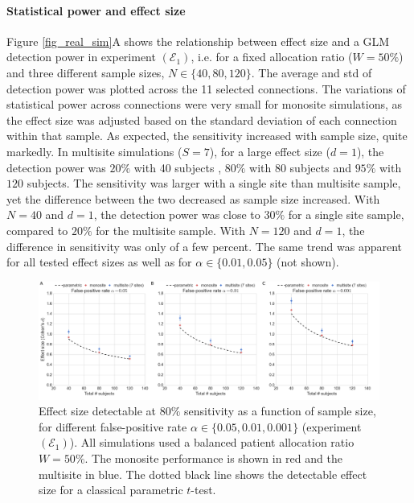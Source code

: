 \documentclass[authoryear]{elsarticle}
\begin{document}
\paragraph{Statistical power and effect size} Figure \ref{fig_real_sim}A shows the relationship between effect size and a GLM detection power in experiment $(\mathcal{E}_1)$, i.e. for a fixed allocation ratio ($W=50\%$) and three different sample sizes, $N\in\{40, 80, 120\}$. The average and std of detection power was plotted across the 11 selected connections. The variations of statistical power across connections were very small for monosite simulations, as the effect size was adjusted based on the standard deviation of each connection within that sample. As expected, the sensitivity increased with sample size, quite markedly. In multisite simulations ($S=7$), for a large effect size ($d=1$), the detection power was $20\%$ with 40 subjects , $80\%$ with 80 subjects and $95\%$ with $120$ subjects. The sensitivity was larger with a single site than multisite sample, yet the difference between the two decreased as sample size increased. With $N=40$ and $d=1$, the detection power was close to $30\%$ for a single site sample, compared to $20\%$ for the multisite sample. With $N=120$ and $d=1$, the difference in sensitivity was only of a few percent. The same trend was apparent for all tested effect sizes as well as for $\alpha\in\{0.01,0.05\}$ (not shown).
\par
\begin{figure}[htbp]\centering
\includegraphics[width=\textwidth]{../figures/samplesize_x_effectsize.png}
\caption[]{
Effect size detectable at $80\%$ sensitivity as a function of sample size, for different false-positive rate $\alpha\in \{0.05,0.01,0.001\}$ (experiment $(\mathcal{E}_1)$). All simulations used a balanced patient allocation ratio $W=50\%$. The monosite performance is shown in red and the multisite in blue. The dotted black line shows the detectable effect size for a classical parametric $t$-test. 
}
\label{fig_sampeffect_curves_alpha001}
\end{figure}
\end{document}
